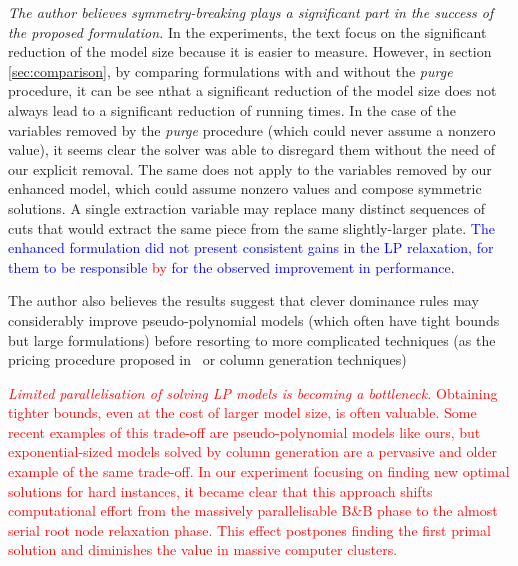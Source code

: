 \documentclass[ppgc,tese,english,formais,babel]{iiufrgs}
\newif\iffinalversion
\newcommand{\newtext}[1]{\iffinalversion%
#1%
\else%
\textcolor{blue}{#1}%
\fi%
}
\newcommand{\oldtext}[1]{\iffinalversion%
\else%
\textcolor{red}{#1}%
\fi%
}
\begin{document}
\emph{The author believes symmetry-breaking plays a significant part in the success of the proposed formulation.}
In the experiments, the text focus on the significant reduction of the model size because it is easier to measure.
However, in section \cref{sec:comparison}, by comparing formulations with and without the \emph{purge} procedure, it can be see nthat a significant reduction of the model size does not always lead to a significant reduction of running times.
In the case of the variables removed by the \emph{purge} procedure (which could never assume a nonzero value), it seems clear the solver was able to disregard them without the need of our explicit removal.
The same does not apply to the variables removed by our enhanced model, which could assume nonzero values and compose symmetric solutions.
A single extraction variable may replace many distinct sequences of cuts that would extract the same piece from the same slightly-larger plate.
\newtext{The enhanced formulation did not present consistent gains in the LP relaxation, for them to be responsible \oldtext{by}\newtext{for} the observed improvement in performance.}
The author also believes the results suggest that clever dominance rules may considerably improve pseudo-polynomial models (which often have tight bounds but large formulations) before resorting to more complicated techniques (as the pricing procedure proposed in~\citet{furini:2016} or column generation techniques)

\oldtext{
\emph{Limited parallelisation of solving LP models is becoming a bottleneck.}
Obtaining tighter bounds, even at the cost of larger model size, is often valuable.
Some recent examples of this trade-off are pseudo-polynomial models like ours, but exponential-sized models solved by column generation are a pervasive and older example of the same trade-off.
In our experiment focusing on finding new optimal solutions for hard instances, it became clear that this approach shifts computational effort from the massively parallelisable B\&B phase to the almost serial root node relaxation phase.
This effect postpones finding the first primal solution and diminishes the value in massive computer clusters.
}

\end{document}
